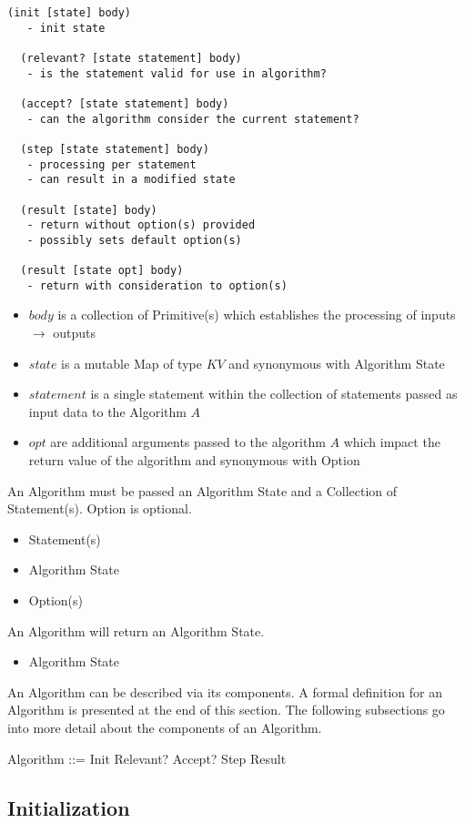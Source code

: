 \documentclass[../main.tex]{subfiles}
\begin{document}
\begin{lstlisting}[frame=single]
  (init [state] body)
   - init state

  (relevant? [state statement] body)
   - is the statement valid for use in algorithm?

  (accept? [state statement] body)
   - can the algorithm consider the current statement?

  (step [state statement] body)
   - processing per statement
   - can result in a modified state

  (result [state] body)
   - return without option(s) provided
   - possibly sets default option(s)

  (result [state opt] body)
   - return with consideration to option(s)
\end{lstlisting}
\begin{itemize}
\item $body$ is a collection of Primitive(s) which establishes the processing of inputs $\to$ outputs
\item $state$ is a mutable Map of type $KV$ and synonymous with Algorithm State
\item $statement$ is a single statement within the collection of statements passed as input data to the Algorithm $A$
\item $opt$ are additional arguments passed to the algorithm $A$ which impact the return value of the algorithm and synonymous with Option
\end{itemize}
An Algorithm must be passed an Algorithm State and a Collection of Statement(s). Option is optional.
\begin{itemize}
\item Statement(s)
\item Algorithm State
\item Option(s)
\end{itemize}
An Algorithm will return an Algorithm State.
\begin{itemize}
\item Algorithm State
\end{itemize}
An Algorithm can be described via its components. A formal definition for an Algorithm
is presented at the end of this section. The following subsections go into more detail about the components of an Algorithm.
\begin{zed}
  Algorithm ::= Init \semi Relevant? \semi Accept? \semi Step \semi Result
\end{zed}
\subsection{Initialization}
\end{document}
